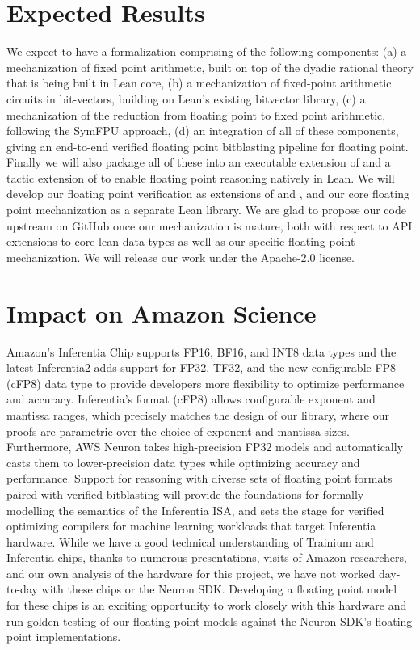 \documentclass[onecolumn]{article}
\begin{document}
\section{Expected Results}

We expect to have a formalization comprising of the following components:
(a) a mechanization of fixed point arithmetic, built on top of the dyadic rational 
theory that is being built in Lean core,
(b) a mechanization of fixed-point arithmetic circuits in bit-vectors, building on Lean's existing bitvector library,
(c) a mechanization of the reduction from floating point to fixed point arithmetic, following the SymFPU approach,
(d) an integration of all of these components, giving an end-to-end verified
floating point bitblasting pipeline for floating point.
Finally we will also package all of these into an executable extension of \leanwuzla{} and a 
tactic extension of \bvdecide{} to enable floating point reasoning natively in Lean.
We will develop our floating point verification as extensions of \bvdecide{} and \leanwuzla{}, 
and our core floating point mechanization as a separate Lean library. We are
glad to propose our code upstream on GitHub once our mechanization is mature, both with
respect to API extensions to core lean data types as well as our specific
floating point mechanization. We will release our work under the Apache-2.0 license.

\section{Impact on Amazon Science}
Amazon's Inferentia Chip supports FP16, BF16, and INT8 data types and the latest
Inferentia2 adds support for FP32, TF32, and the new configurable FP8 (cFP8)
data type to provide developers more flexibility to optimize performance and
accuracy. Inferentia's format (cFP8) allows configurable exponent and mantissa ranges,
which precisely matches the design of our library, where our proofs are 
parametric over the choice of exponent and mantissa sizes.
Furthermore,  AWS Neuron takes high-precision FP32 models and
automatically casts them to lower-precision data types while optimizing accuracy
and performance. Support for reasoning with diverse sets of 
floating point formats paired with verified bitblasting will provide the foundations
for formally modelling the semantics of the Inferentia ISA, and sets the stage for verified
optimizing compilers for machine learning workloads that target Inferentia hardware.
While we have a good technical understanding of Trainium and Inferentia chips, thanks to numerous presentations, visits of Amazon researchers, and 
our own analysis of the hardware for this project, we have not worked day-to-day
with these chips or the Neuron SDK. Developing a floating point model for these chips is an exciting opportunity
to work closely with this hardware and run golden testing of our floating point models
against the Neuron SDK's floating point implementations.
\end{document}
